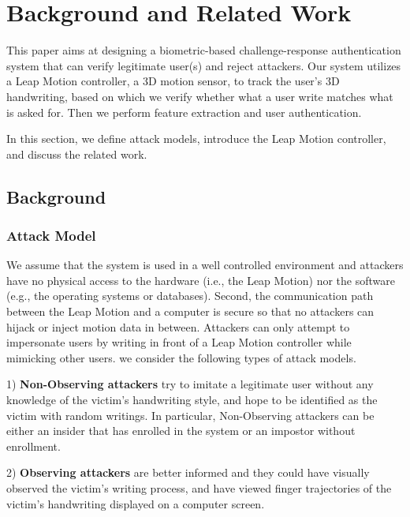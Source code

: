 \section{Background and Related Work}\label{sec:background}

This paper aims at designing a biometric-based challenge-response authentication system that can verify legitimate user(s) and reject attackers.
Our system utilizes a Leap Motion controller, a 3D motion sensor, to track the user's 3D handwriting, based on which we verify whether what a user write matches what is asked for. Then we perform feature extraction and user authentication. 

In this section, we define attack models, introduce the Leap Motion controller, and discuss the related work. 



\subsection{Background}
\label{sec:bg}

\subsubsection{Attack Model}
We assume that the system is used in a well controlled environment and attackers have no physical access to the hardware (i.e., the Leap Motion) nor the software (e.g., the operating systems or databases). Second, the communication path between the Leap Motion and a computer is secure so that no attackers can hijack or inject motion data in between. Attackers can only attempt to impersonate users by writing in front of a Leap Motion controller while mimicking other users. 
we consider the following  types of attack models. 

1) \textbf{Non-Observing attackers} try to imitate a legitimate user without any knowledge of the victim's handwriting style, and hope to be identified as the victim with random writings. In particular, Non-Observing attackers can be either an insider that has enrolled in the \CiT system or an impostor without enrollment.  


2) \textbf{Observing attackers} are better informed and they could have visually observed the victim's writing process, %
and have viewed finger trajectories of the victim's handwriting displayed on a computer screen.  


